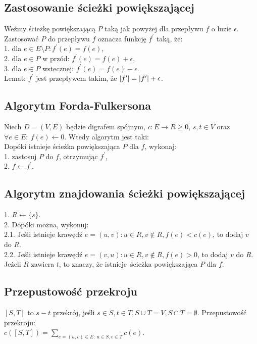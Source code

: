 \subsection*{Zastosowanie ścieżki powiększającej}
Weźmy ścieżkę powiększającą $P$ taką jak powyżej dla przepływu $f$ o luzie $\epsilon$.
Zastosować $P$ do przepływu $f$ oznacza funkcję $f^\prime$ taką, że: \\
1. dla $e \in E \setminus P: f^\prime(e) = f(e)$, \\
2. dla $e \in P$ w przód: $f^\prime(e) = f(e) + \epsilon$, \\
3. dla $e \in P$ wstecznej: $f^\prime(e) = f(e) - \epsilon$. \\

Lemat: $f^\prime$ jest przepływem takim, że $\left| f^\prime \right| = \left| f^\prime \right| + \epsilon$.

\subsection*{Algorytm Forda-Fulkersona}
Niech $D = (V, E)$ będzie digrafem spójnym, $c: E \to R \geq 0$, $s, t \in V$ oraz
$\forall e \in E: \ f(e) \leftarrow 0$. Wtedy algorytm jest taki: \\
Dopóki istnieje ścieżka powiększająca $P$ dla $f$, wykonaj: \\
1. zastosuj $P$ do $f$, otrzymując $f^\prime$, \\
2. $f \leftarrow f^\prime$.

\subsection*{Algorytm znajdowania ścieżki powiększającej}
1. $R \leftarrow \{ s \}$. \\
2. Dopóki można, wykonuj: \\
2.1. Jeśli istnieje krawędź $e = (u, v): u \in R, v \notin R, f(e) < c(e)$,
     to dodaj $v$ do $R$. \\
2.2. Jeśli istnieje krawędź $e = (v, u): u \in R, v \notin R, f(e) > 0$,
     to dodaj $v$ do $R$. \\
Jeżeli $R$ zawiera $t$, to znaczy, że istnieje ścieżka powiększająca $P$ dla $f$.

\subsection*{Przepustowość przekroju}
$[S, T]$ to $s-t$ przekrój, jeśli $s \in S, t \in T, S \cup T = V, S \cap T = \emptyset$.
Przepustowość przekroju: \\
$c([S, T]) = \sum\limits_{e=(u,v) \in E: \ u \in S, v \in T} c(e)$. \\

